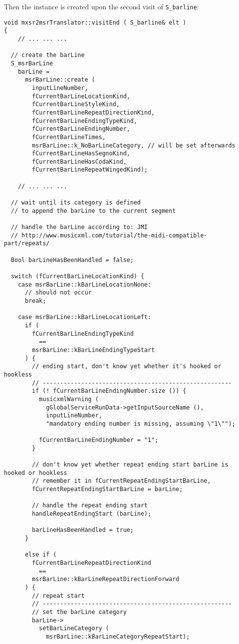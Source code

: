 Then the  instance is created upon the second visit of {\tt S_barline}:%
\begin{lstlisting}[language=CPlusPlus]
void mxsr2msrTranslator::visitEnd ( S_barline& elt )
{
	// ... ... ...

  // create the barLine
  S_msrBarLine
    barLine =
      msrBarLine::create (
        inputLineNumber,
        fCurrentBarLineLocationKind,
        fCurrentBarLineStyleKind,
        fCurrentBarLineRepeatDirectionKind,
        fCurrentBarLineEndingTypeKind,
        fCurrentBarLineEndingNumber,
        fCurrentBarLineTimes,
        msrBarLine::k_NoBarLineCategory, // will be set afterwards
        fCurrentBarLineHasSegnoKind,
        fCurrentBarLineHasCodaKind,
        fCurrentBarLineRepeatWingedKind);

	// ... ... ...

  // wait until its category is defined
  // to append the barLine to the current segment

  // handle the barLine according to: JMI
  // http://www.musicxml.com/tutorial/the-midi-compatible-part/repeats/

  Bool barLineHasBeenHandled = false;

  switch (fCurrentBarLineLocationKind) {
    case msrBarLine::kBarLineLocationNone:
      // should not occur
      break;

    case msrBarLine::kBarLineLocationLeft:
      if (
        fCurrentBarLineEndingTypeKind
          ==
        msrBarLine::kBarLineEndingTypeStart
      ) {
        // ending start, don't know yet whether it's hooked or hookless
        // ------------------------------------------------------
        if (! fCurrentBarLineEndingNumber.size ()) {
          musicxmlWarning (
            gGlobalServiceRunData->getInputSourceName (),
            inputLineNumber,
            "mandatory ending number is missing, assuming \"1\"");

          fCurrentBarLineEndingNumber = "1";
        }

        // don't know yet whether repeat ending start barLine is hooked or hookless
        // remember it in fCurrentRepeatEndingStartBarLine,
        fCurrentRepeatEndingStartBarLine = barLine;

        // handle the repeat ending start
        handleRepeatEndingStart (barLine);

        barLineHasBeenHandled = true;
      }

      else if (
        fCurrentBarLineRepeatDirectionKind
          ==
        msrBarLine::kBarLineRepeatDirectionForward
      ) {
        // repeat start
        // ------------------------------------------------------
        // set the barLine category
        barLine->
          setBarLineCategory (
            msrBarLine::kBarLineCategoryRepeatStart);


\end{lstlisting}
